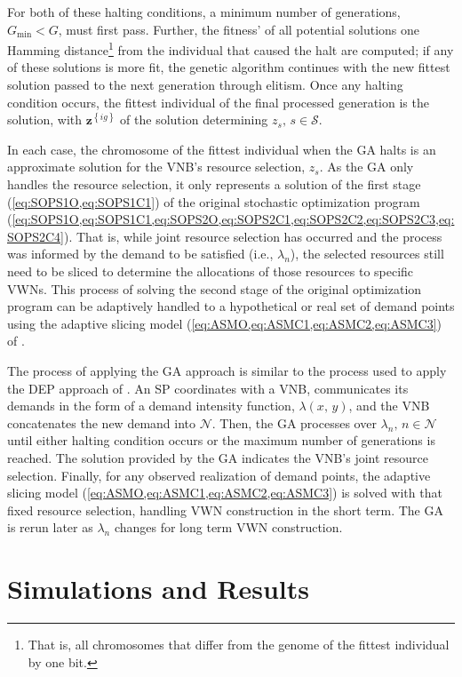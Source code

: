 \documentclass[12pt,dvipsnames]{report}
\begin{document}
For both of these halting conditions, a minimum number of generations, $G_{\min} < G$, must first pass.  Further, the fitness' of all potential solutions one Hamming distance\footnote{That is, all chromosomes that differ from the genome of the fittest individual by one bit.} from the individual that caused the halt are computed; if any of these solutions is more fit, the genetic algorithm continues with the new fittest solution passed to the next generation through elitism.  Once any halting condition occurs, the fittest individual of the final processed generation is the solution, with $\textbf{z}^{\left\{ ig \right\}}$ of the solution determining $z_s,\, s \in \mathcal{S}$.

In each case, the chromosome of the fittest individual when the GA halts is an approximate solution for the VNB's resource selection, $z_s$.  As the GA only handles the resource selection, it only represents a solution of the first stage (\cref{eq:SOPS1O,eq:SOPS1C1}) of the original stochastic optimization program (\cref{eq:SOPS1O,eq:SOPS1C1,eq:SOPS2O,eq:SOPS2C1,eq:SOPS2C2,eq:SOPS2C3,eq:SOPS2C4}).  That is, while joint resource selection has occurred and the process was informed by the demand to be satisfied (i.e., $\lambda_n$), the selected resources still need to be sliced to determine the allocations of those resources to specific VWNs.  This process of solving the second stage of the original optimization program can be adaptively handled to a hypothetical or real set of demand points using the adaptive slicing model (\cref{eq:ASMO,eq:ASMC1,eq:ASMC2,eq:ASMC3}) of .

The process of applying the GA approach is similar to the process used to apply the DEP approach of .  An SP coordinates with a VNB, communicates its demands in the form of a demand intensity function, $\lambda \left( x,\, y \right)$, and the VNB concatenates the new demand into $\mathcal{N}$.  Then, the GA processes over $\lambda_n,\, n \in \mathcal{N}$ until either halting condition occurs or the maximum number of generations is reached.  The solution provided by the GA indicates the VNB's joint resource selection.  Finally, for any observed realization of demand points, the adaptive slicing model (\cref{eq:ASMO,eq:ASMC1,eq:ASMC2,eq:ASMC3}) is solved with that fixed resource selection, handling VWN construction in the short term.  The GA is rerun later as $\lambda_n$ changes for long term VWN construction.
\fi

\iftrue
\pagebreak
\chapter{Simulations and Results} \label{ch:sim}
\end{document}
